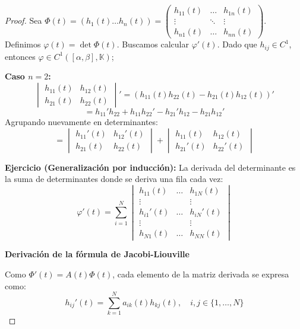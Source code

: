 \begin{proof}
Sea $\Phi(t) = (h_1(t) \dots h_n(t)) = \begin{pmatrix} h_{11}(t) & \dots & h_{1n}(t) \\ \vdots & \ddots & \vdots \\ h_{n1}(t) & \dots & h_{nn}(t) \end{pmatrix}$.
Definimos $\varphi(t) = \det \Phi(t)$. Buscamos calcular $\varphi'(t)$.
Dado que $h_{ij} \in C^1$, entonces $\varphi \in C^1([\alpha, \beta], \mathbb{K})$;

\textbf{Caso $n=2$:}
\[
\begin{vmatrix} h_{11}(t) & h_{12}(t) \\ h_{21}(t) & h_{22}(t) \end{vmatrix}' = (h_{11}(t)h_{22}(t) - h_{21}(t)h_{12}(t))' 
\]
\[
= h_{11}'h_{22} + h_{11}h_{22}' - h_{21}'h_{12} - h_{21}h_{12}' 
\]
Agrupando nuevamente en determinantes:
\[
= \begin{vmatrix} h_{11}'(t) & h_{12}'(t) \\ h_{21}(t) & h_{22}(t) \end{vmatrix} + \begin{vmatrix} h_{11}(t) & h_{12}(t) \\ h_{21}'(t) & h_{22}'(t) \end{vmatrix} 
\]

\textbf{Ejercicio (Generalización por inducción):}
La derivada del determinante es la suma de determinantes donde se deriva una fila cada vez:
\[
\varphi'(t) = \sum_{i=1}^{N} \begin{vmatrix} h_{11}(t) & \dots & h_{1N}(t) \\ \vdots & & \vdots \\ h_{i1}'(t) & \dots & h_{iN}'(t) \\ \vdots & & \vdots \\ h_{N1}(t) & \dots & h_{NN}(t) \end{vmatrix} 
\]

\textbf{Derivación de la fórmula de Jacobi-Liouville}

Como $\Phi'(t) = A(t)\Phi(t)$, cada elemento de la matriz derivada se expresa como:
\[
h_{ij}'(t) = \sum_{k=1}^N a_{ik}(t) h_{kj}(t), \quad i,j \in \{1, \dots, N\} 
\]


\end{proof}
